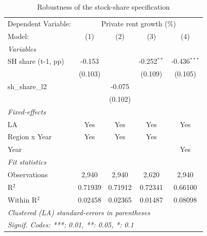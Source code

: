 
\begin{table}[htbp]
   \caption{Robustness of the stock-share specification}
   \centering
   \begin{tabular}{lcccc}
      \tabularnewline \midrule \midrule
      Dependent Variable: & \multicolumn{4}{c}{Private rent growth (\%)}\\
      Model:             & (1)     & (2)     & (3)           & (4)\\  
      \midrule
      \emph{Variables}\\
      SH share (t-1, pp) & -0.153  &         & -0.252$^{**}$ & -0.436$^{***}$\\   
                         & (0.103) &         & (0.109)       & (0.105)\\   
      sh\_share\_l2      &         & -0.075  &               &   \\   
                         &         & (0.102) &               &   \\   
      \midrule
      \emph{Fixed-effects}\\
      LA                 & Yes     & Yes     & Yes           & Yes\\  
      Region x Year      & Yes     & Yes     & Yes           & \\  
      Year               &         &         &               & Yes\\  
      \midrule
      \emph{Fit statistics}\\
      Observations       & 2,940   & 2,940   & 2,620         & 2,940\\  
      R$^2$              & 0.71939 & 0.71912 & 0.72341       & 0.66100\\  
      Within R$^2$       & 0.02458 & 0.02365 & 0.01487       & 0.08098\\  
      \midrule \midrule
      \multicolumn{5}{l}{\emph{Clustered (LA) standard-errors in parentheses}}\\
      \multicolumn{5}{l}{\emph{Signif. Codes: ***: 0.01, **: 0.05, *: 0.1}}\\
   \end{tabular}
\end{table}



